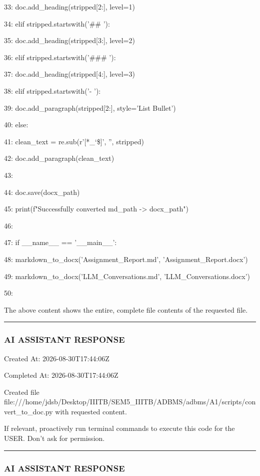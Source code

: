 \documentclass[11pt,a4paper]{article}
\begin{document}
{33:             doc.add\_heading(stripped[2:], level=1)

34:         elif stripped.startswith('\#\# '):

35:             doc.add\_heading(stripped[3:], level=2)

36:         elif stripped.startswith('\#\#\# '):

37:             doc.add\_heading(stripped[4:], level=3)

38:         elif stripped.startswith('- '):

39:             doc.add\_paragraph(stripped[2:], style='List Bullet')

40:         else:

41:             clean\_text = re.sub(r'[*\_`\$]', '', stripped)

42:             doc.add\_paragraph(clean\_text)

43:

44:     doc.save(docx\_path)

45:     print(f"Successfully converted {md\_path} -> {docx\_path}")

46:

47: if \_\_name\_\_ == '\_\_main\_\_':

48:     markdown\_to\_docx('Assignment\_Report.md', 'Assignment\_Report.docx')

49:     markdown\_to\_docx('LLM\_Conversations.md', 'LLM\_Conversations.docx')

50:

The above content shows the entire, complete file contents of the requested file.


\hrule

\subsubsection{AI ASSISTANT RESPONSE}

Created At: 2026-08-30T17:44:06Z

Completed At: 2026-08-30T17:44:06Z

Created file file:///home/jdsb/Desktop/IIITB/SEM5\_IIITB/ADBMS/adbms/A1/scripts/convert\_to\_doc.py with requested content.

If relevant, proactively run terminal commands to execute this code for the USER. Don't ask for permission.


\hrule

\subsubsection{AI ASSISTANT RESPONSE}

}
\end{document}
